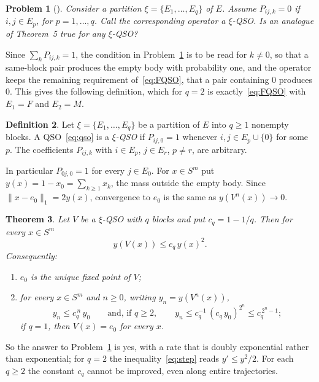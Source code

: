 \documentclass[11pt]{amsart}
\newtheorem{theorem}{Theorem}[section]
\newtheorem{problem}[theorem]{Problem}
\theoremstyle{definition}
\newtheorem{definition}[theorem]{Definition}
\theoremstyle{remark}
\numberwithin{equation}{section}
\begin{document}
\begin{problem}[{\cite[Problem~10]{GR}}]\label{prob}
Consider a partition $\xi=\{E_1,\dots,E_q\}$ of $E$. Assume $P_{ij,k}=0$ if $i,j\in E_p$, for $p=1,\dots,q$. Call the corresponding operator a $\xi$-QSO. Is an analogue of Theorem~5 true for any $\xi$-QSO?
\end{problem}

Since $\sum_kP_{ij,k}=1$, the condition in Problem~\ref{prob} is to be read for $k\neq0$, so that a same-block pair produces the empty body with probability one, and the operator keeps the remaining requirement of~\eqref{eq:FQSO}, that a pair containing $0$ produces $0$. This gives the following definition, which for $q=2$ is exactly~\eqref{eq:FQSO} with $E_1=F$ and $E_2=M$.

\begin{definition}\label{def:xi}
Let $\xi=\{E_1,\dots,E_q\}$ be a partition of $E$ into $q\ge1$ nonempty blocks. A QSO~\eqref{eq:qso} is a \emph{$\xi$-QSO} if $P_{ij,0}=1$ whenever $i,j\in E_p\cup\{0\}$ for some $p$. The coefficients $P_{ij,k}$ with $i\in E_p$, $j\in E_r$, $p\neq r$, are arbitrary.
\end{definition}

In particular $P_{0j,0}=1$ for every $j\in E_0$. For $x\in S^m$ put $y(x)=1-x_0=\sum_{k\ge1}x_k$, the mass outside the empty body. Since $\|x-e_0\|_1=2y(x)$, convergence to $e_0$ is the same as $y(V^n(x))\to0$.

\begin{theorem}\label{thm:main}
Let $V$ be a $\xi$-QSO with $q$ blocks and put $c_q=1-1/q$. Then for every $x\in S^m$
\begin{equation}\label{eq:step}
y(V(x))\le c_q\,y(x)^2 .
\end{equation}
Consequently:
\begin{enumerate}[label=\textup{(\roman*)}]
\item $e_0$ is the unique fixed point of $V$;
\item for every $x\in S^m$ and $n\ge0$, writing $y_n=y(V^n(x))$,
\[
y_n\le c_q^{\,n}\,y_0\qquad\text{and, if } q\ge2,\qquad y_n\le c_q^{-1}\,(c_q\,y_0)^{2^n}\le c_q^{\,2^n-1};
\]
if $q=1$, then $V(x)=e_0$ for every $x$.
\end{enumerate}
\end{theorem}

So the answer to Problem~\ref{prob} is yes, with a rate that is doubly exponential rather than exponential; for $q=2$ the inequality~\eqref{eq:step} reads $y'\le y^2/2$. For each $q\ge2$ the constant $c_q$ cannot be improved, even along entire trajectories.
\end{document}
